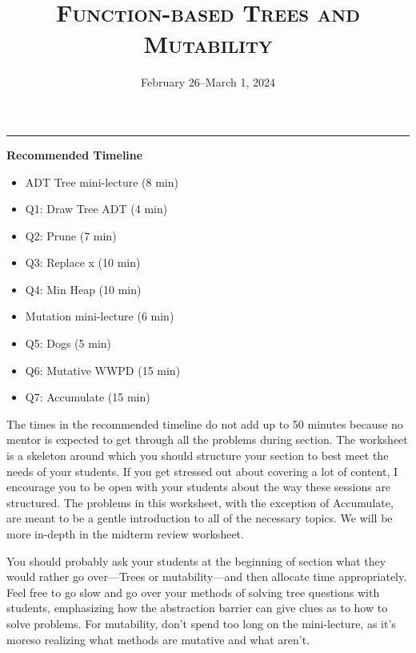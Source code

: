 \documentclass{exam}
\title{\textsc{Function-based Trees and Mutability}}
\date{February 26--March 1, 2024}
\begin{document}
\maketitle
\rule{\textwidth}{0.15em}


\begin{meta}
\textbf{Recommended Timeline}
\begin{itemize}
    \item ADT Tree mini-lecture (8 min)
    \item Q1: Draw Tree ADT (4 min)
    \item Q2: Prune (7 min)
    \item Q3: Replace x (10 min)
    \item Q4: Min Heap (10 min)
    \item Mutation mini-lecture (6 min)
    \item Q5: Dogs (5 min)
    \item Q6: Mutative WWPD (15 min)
    \item Q7: Accumulate (15 min)
\end{itemize}
The times in the recommended timeline do not add up to 50 minutes because no mentor
is expected to get through all the problems during section. The worksheet is a skeleton
around which you should structure your section to best meet the needs of your students.
If you get stressed out about covering a lot of content, I encourage you to be open with
your students about the way these sessions are structured. The problems in this worksheet, with the exception of Accumulate, 
are meant to be a gentle introduction to all of the necessary topics. We will be more in-depth in the midterm review worksheet.

You should probably ask your students at the beginning of section what they would rather go
over---Trees or mutability---and then allocate time appropriately.
Feel free to go slow and go over your methods of solving tree questions with students, emphasizing how the abstraction barrier can give clues 
as to how to solve problems. For mutability, don't spend too long on the mini-lecture, as it's moreso realizing what methods are mutative and what aren't.
\end{meta}
\end{document}
